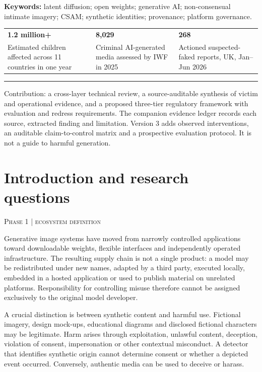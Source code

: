 \documentclass[10pt,a4paper]{article}
\newcommand{\sect}[2]{\Needspace{6\baselineskip}\section{#1}\textcolor{muted}{\small\textsc{#2}}\par\vspace{2mm}}
\begin{document}
\textbf{Keywords:} latent diffusion; open weights; generative AI; non-consensual intimate imagery; CSAM; synthetic identities; provenance; platform governance.\par
\vspace{3mm}
\noindent\begin{tabularx}{\linewidth}{@{}YYY@{}}
{\color{ink}\Large\bfseries 1.2 million+} & {\color{ink}\Large\bfseries 8,029} & {\color{ink}\Large\bfseries 268}\\
\small Estimated children affected across 11 countries in one year & \small Criminal AI-generated media assessed by IWF in 2025 & \small Actioned suspected-faked reports, UK, Jan--Jun 2026\\
\end{tabularx}
\par{}\par
\vspace{1mm}\rule{\linewidth}{0.4pt}

Contribution: a cross-layer technical review, a source-auditable synthesis of victim and operational evidence, and a proposed three-tier regulatory framework with evaluation and redress requirements. The companion evidence ledger records each source, extracted finding and limitation. Version 3 adds observed interventions, an auditable claim-to-control matrix and a prospective evaluation protocol. It is not a guide to harmful generation.


\clearpage\sect{Introduction and research questions}{Phase 1 | ecosystem definition}

Generative image systems have moved from narrowly controlled applications toward downloadable weights, flexible interfaces and independently operated infrastructure. The resulting supply chain is not a single product: a model may be redistributed under new names, adapted by a third party, executed locally, embedded in a hosted application or used to publish material on unrelated platforms. Responsibility for controlling misuse therefore cannot be assigned exclusively to the original model developer.


A crucial distinction is between synthetic content and harmful use. Fictional imagery, design mock-ups, educational diagrams and disclosed fictional characters may be legitimate. Harm arises through exploitation, unlawful content, deception, violation of consent, impersonation or other contextual misconduct. A detector that identifies synthetic origin cannot determine consent or whether a depicted event occurred. Conversely, authentic media can be used to deceive or harass. \cite{nist,fbi}
\end{document}
